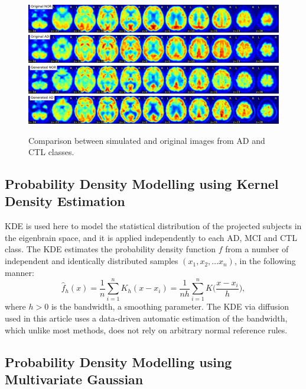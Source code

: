\begin{figure}[!h]
	\centering
	\includegraphics[width=0.7\linewidth]{Graphics/ch9/originalNOR}\\
	\includegraphics[width=0.7\linewidth]{Graphics/ch9/originalAD}\\
	\includegraphics[width=0.7\linewidth]{Graphics/ch9/generatedNOR}\\
	\includegraphics[width=0.7\linewidth]{Graphics/ch9/generatedAD}
	\caption[Comparison between simulated and original images from \acs{AD} and \acs{CTL} classes.]{Comparison between simulated and original images from \ac{AD} and \ac{CTL} classes.}
	\label{fig:comparisonSimulation}
\end{figure}

\subsection{Probability Density Modelling using Kernel Density Estimation}
\ac{KDE} is used here to model the statistical distribution of the projected subjects in the eigenbrain space, and it is applied independently to each \ac{AD}, \ac{MCI} and \ac{CTL} class. The \ac{KDE} estimates the probability density function $f$ from a number of independent and identically distributed samples $(x_1, x_2, \dots x_n)$, in the following manner:
\begin{equation}
\hat{f}_h(x) = \frac{1}{n}\sum_{i=1}^n K_h (x - x_i) = \frac{1}{nh} \sum_{i=1}^n K\Big(\frac{x-x_i}{h}\Big),
\end{equation}
where $h>0$ is the bandwidth, a smoothing parameter. The \ac{KDE} via diffusion \cite{Botev2010} used in this article uses a data-driven automatic estimation of the bandwidth, which unlike most methods, does not rely on arbitrary normal reference rules. 

\subsection{Probability Density Modelling using Multivariate Gaussian}

